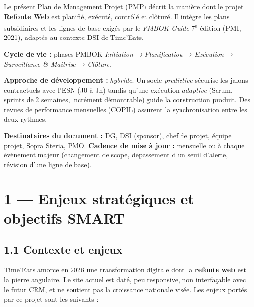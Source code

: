 \documentclass[11pt,a4paper,oneside]{report}
\begin{document}
Le présent Plan de Management Projet (PMP) décrit la manière dont le projet
\textbf{Refonte Web} est planifié, exécuté, contrôlé et clôturé. Il intègre les plans
subsidiaires et les lignes de base exigés par le \textit{PMBOK Guide} 7\textsuperscript{e}
édition (PMI, 2021), adaptés au contexte DSI de Time'Eats.

\textbf{Cycle de vie :} phases PMBOK \textit{Initiation → Planification → Exécution →
Surveillance \& Maîtrise → Clôture}.

\textbf{Approche de développement :} \textit{hybride}. Un socle \textit{predictive} sécurise
les jalons contractuels avec l'ESN (J0 à Jn) tandis qu'une exécution \textit{adaptive}
(Scrum, sprints de 2 semaines, incrément démontrable) guide la construction produit. Des
revues de performance mensuelles (COPIL) assurent la synchronisation entre les deux rythmes.

\textbf{Destinataires du document :} DG, DSI (sponsor), chef de projet, équipe projet,
Sopra Steria, PMO. \textbf{Cadence de mise à jour :} mensuelle ou à chaque événement majeur
(changement de scope, dépassement d'un seuil d'alerte, révision d'une ligne de base).

\section*{1 — Enjeux stratégiques et objectifs SMART}

\subsection*{1.1 Contexte et enjeux}

Time'Eats amorce en 2026 une transformation digitale dont la \textbf{refonte web} est la
pierre angulaire. Le site actuel est daté, peu responsive, non interfaçable avec le futur
CRM, et ne soutient pas la croissance nationale visée. Les enjeux portés par ce projet sont
les suivants :
\end{document}
